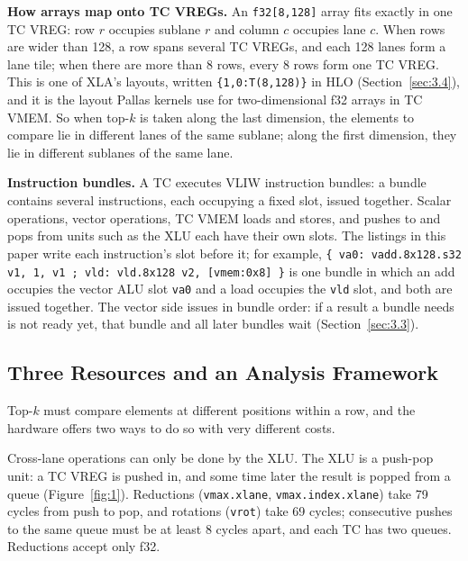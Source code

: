 \documentclass[sigconf,nonacm,balance=false]{acmart}
\newcommand{\code}[1]{\texttt{#1}}
\begin{document}
\textbf{How arrays map onto TC VREGs.} An \code{f32[8,\allowbreak{}128]} array fits exactly in one TC VREG: row $r$ occupies sublane $r$ and column $c$ occupies lane $c$. When rows are wider than 128, a row spans several TC VREGs, and each 128 lanes form a lane tile; when there are more than 8 rows, every 8 rows form one TC VREG. This is one of XLA's layouts, written \code{\{1,\allowbreak{}0:T(\allowbreak{}8,\allowbreak{}128)\}} in HLO (Section~\ref{sec:3.4}), and it is the layout Pallas kernels use for two-dimensional f32 arrays in TC VMEM. So when top-$k$ is taken along the last dimension, the elements to compare lie in different lanes of the same sublane; along the first dimension, they lie in different sublanes of the same lane.

\textbf{Instruction bundles.} A TC executes VLIW instruction bundles: a bundle contains several instructions, each occupying a fixed slot, issued together. Scalar operations, vector operations, TC VMEM loads and stores, and pushes to and pops from units such as the XLU each have their own slots. The listings in this paper write each instruction's slot before it; for example, \code{\{ va0: vadd.\allowbreak{}8x128.\allowbreak{}s32 v1,\allowbreak{} 1,\allowbreak{} v1 ; vld: vld.\allowbreak{}8x128 v2,\allowbreak{} [vmem:0x8] \}} is one bundle in which an add occupies the vector ALU slot \code{va0} and a load occupies the \code{vld} slot, and both are issued together. The vector side issues in bundle order: if a result a bundle needs is not ready yet, that bundle and all later bundles wait (Section~\ref{sec:3.3}).

\subsection{Three Resources and an Analysis Framework}
\label{sec:2.2}

Top-$k$ must compare elements at different positions within a row, and the hardware offers two ways to do so with very different costs.

Cross-lane operations can only be done by the XLU. The XLU is a push-pop unit: a TC VREG is pushed in, and some time later the result is popped from a queue (Figure~\ref{fig:1}). Reductions (\code{vmax.\allowbreak{}xlane}, \code{vmax.\allowbreak{}index.\allowbreak{}xlane}) take 79 cycles from push to pop, and rotations (\code{vrot}) take 69 cycles; consecutive pushes to the same queue must be at least 8 cycles apart, and each TC has two queues. Reductions accept only f32.
\end{document}

